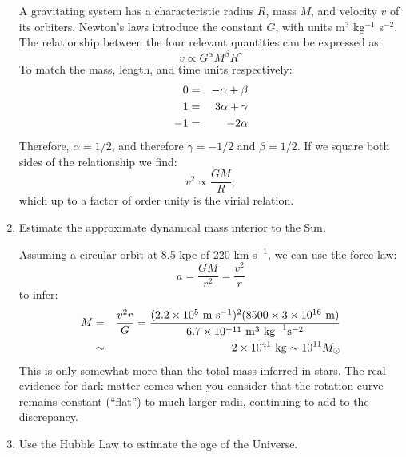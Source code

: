 \begin{enumerate}
\begin{answer}
A gravitating system has a characteristic radius $R$, mass $M$, and
velocity $v$ of its orbiters.  Newton's laws introduce the constant
$G$, with units m$^3$ kg$^{-1}$ s$^{-2}$. The relationship between the
four relevant quantities can be expressed as:
\begin{equation}
v \propto G^\alpha M^\beta R^\gamma
\end{equation}
To match the mass, length, and time units respectively:
\begin{eqnarray}
0 &=& -\alpha + \beta \cr
1 &=& 3\alpha + \gamma \cr
- 1 &=& -2 \alpha
\end{eqnarray}
Therefore, $\alpha = 1/2$, and therefore $\gamma = - 1/2$ and
$\beta=1/2$. If we square both sides of the relationship we find:
\begin{equation}
v^2 \propto \frac{G M}{R},
\end{equation}
which up to a factor of order unity is the virial relation. 
\end{answer}
\item Estimate the approximate dynamical mass interior to the Sun. 

\begin{answer}
  Assuming a circular orbit at 8.5 kpc of 220 km s$^{-1}$, we can use
  the force law:
  \begin{equation}
   a = \frac{GM}{r^2} = \frac{v^2}{r}
  \end{equation}
  to infer:
  \begin{eqnarray}
   M &=& \frac{v^2 r}{G} =  \frac{(2.2 \times 10^5 {\rm ~m} {\rm
       ~s}^{-1})^2 (8500 \times 3 \times 10^{16} {\rm ~m})}
   {6.7 \times 10^{-11} {\rm ~m}^3 {\rm ~kg}^{-1} {\rm s}^{-2}} \cr
   &\sim& 2\times 10^{41} {\rm ~kg} \sim 10^{11} M_\odot 
  \end{eqnarray}
  This is only somewhat more than the total mass inferred in stars. The
  real evidence for  dark matter comes when you consider that the
  rotation curve remains constant (``flat'') to much larger radii,
  continuing to add to the discrepancy.
\end{answer}
\item Use the Hubble Law to estimate the age of the Universe.


\end{enumerate}
